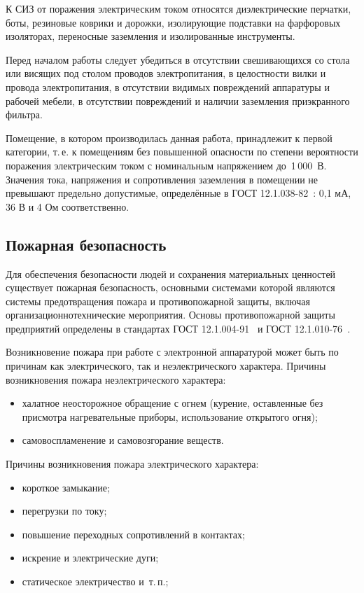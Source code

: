 К СИЗ от поражения электрическим током относятся диэлектрические перчатки, боты, резиновые коврики и дорожки, изолирующие подставки на фарфоровых изоляторах, переносные заземления и изолированные инструменты.

Перед началом работы следует убедиться в отсутствии свешивающихся со стола или висящих под столом проводов электропитания, в целостности вилки и провода электропитания, в отсутствии видимых повреждений аппаратуры и рабочей мебели, в отсутствии повреждений и наличии заземления приэкранного фильтра.

Помещение, в котором производилась данная работа, принадлежит к первой категории, т.\,е. к помещениям без повышенной опасности по степени вероятности поражения электрическим током с номинальным напряжением до~1\,000~В.
Значения тока, напряжения и сопротивления заземления в помещении не превышают предельно допустимые, определённые в ГОСТ 12.1.038-82~\cite{Gost1983}: 0,1 мА, 36 В и 4 Ом соответственно.


\subsection{Пожарная безопасность}

Для обеспечения безопасности людей и сохранения материальных ценностей существует пожарная безопасность, основными системами которой являются системы предотвращения пожара и противопожарной защиты, включая организационно\-технические мероприятия.
Основы противопожарной защиты предприятий определены в стандартах ГОСТ 12.1.004-91~\cite{Gost1992} и ГОСТ 12.1.010-76~\cite{Gost1976}.

Возникновение пожара при работе с электронной аппаратурой может быть по причинам как электрического, так и неэлектрического характера.
Причины возникновения пожара неэлектрического характера:
\begin{itemize}
    \item халатное неосторожное обращение с огнем (курение, оставленные без присмотра нагревательные приборы, использование открытого огня);
    \item самовоспламенение и самовозгорание веществ.
\end{itemize}

Причины возникновения пожара электрического характера:
\begin{itemize}
    \item короткое замыкание;
    \item перегрузки по току;
    \item повышение переходных сопротивлений в контактах;
    \item искрение и электрические дуги;
    \item статическое электричество и~т.\,п.;
\end{itemize}

